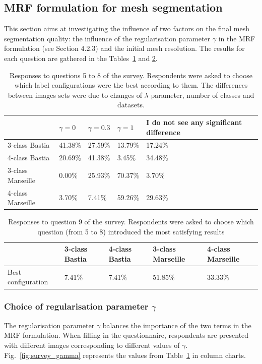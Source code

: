 \documentclass{kththesis}
\begin{document}
\subsection{MRF formulation for mesh segmentation}
This section aims at investigating the influence of two factors on the final mesh segmentation quality: the influence of the regularisation parameter $\gamma$ in the MRF formulation (see Section 4.2.3) and the initial mesh resolution. The results for each question are gathered in the Tables~\ref{table:mrf_survey_res} and \ref{table:mrf_survey_res_2}. 
%
\begin{table}[H]
\centering
\begin{tabular}{|p{}|| p{}| p{}| p{}|p{}|}
\hline 
 & $\gamma = 0$ & $\gamma=0.3$ & $\gamma=1$ &I do not see any significant difference \\
\hline
3-class Bastia &  41.38\% &27.59\%& 13.79\% &17.24\% \\
\hline
4-class Bastia & 20.69\% &41.38\% &3.45\%& 34.48\% \\
\hline
3-class Marseille &0.00\%& 25.93\%& 70.37\% &3.70\%\\
\hline
4-class Marseille & 3.70\% & 7.41\%& 59.26\%& 29.63\%\\
\hline
\end{tabular}
\caption{Responses to questions 5 to 8 of the survey. Respondents were asked to choose which label configurations were the best according to them. The differences between images sets were due to changes of $\lambda$ parameter, number of classes and datasets.}
\label{table:mrf_survey_res}
\end{table}

\begin{table}
\begin{tabular}{|p{}| p{}|p{} |p{}| p{}|}
\hline
& 3-class Bastia & 4-class Bastia & 3-class Marseille & 4-class Marseille \\
\hline
Best configuration & 7.41\%& 7.41\%& 51.85\%& 33.33\% \\
\hline
\end{tabular}
\caption{Responses to question 9 of the survey. Respondents were asked to choose which question (from 5 to 8) introduced the most satisfying results}
\label{table:mrf_survey_res_2}
\end{table}

\subsubsection{Choice of regularisation parameter $\gamma$}
The regularisation parameter $\gamma$ balances the importance of the two terms in the MRF formulation. When filling in the questionnaire, respondents are presented with different images corresponding to different values of $\gamma$. Fig.~\ref{fig:survey_gamma} represents the values from Table~\ref{table:mrf_survey_res} in column charts.
\end{document}

